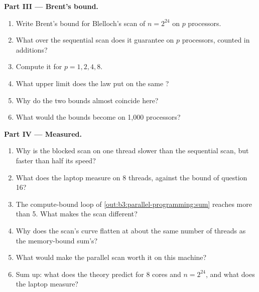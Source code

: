 \begin{problem}
\medskip\noindent\textbf{Part III --- Brent's bound.}
\begin{enumerate}[resume]
  \item Write Brent's bound for Blelloch's scan of $n = 2^{24}$ on $p$ processors.
  \item What  over the sequential scan does it guarantee on $p$ processors, counted in additions?
  \item Compute it for $p = 1, 2, 4, 8$.
  \item What upper limit does the  law put on the same ?
  \item Why do the two bounds almost coincide here?
  \item What would the bounds become on 1,000 processors?
\end{enumerate}

\medskip\noindent\textbf{Part IV --- Measured.}
\begin{enumerate}[resume]
  \item Why is the blocked scan on one thread slower than the sequential scan, but faster than half its speed?
  \item What  does the laptop measure on 8 threads, against the bound of question 16?
  \item The compute-bound loop of \cref{out:b3:parallel-programming:sum} reaches more than 5. What makes the scan different?
  \item Why does the scan's curve flatten at about the same number of threads as the memory-bound sum's?
  \item What would make the parallel scan worth it on this machine?
  \item Sum up: what does the theory predict for 8 cores and $n = 2^{24}$, and what does the laptop measure?
\end{enumerate}
\end{problem}
